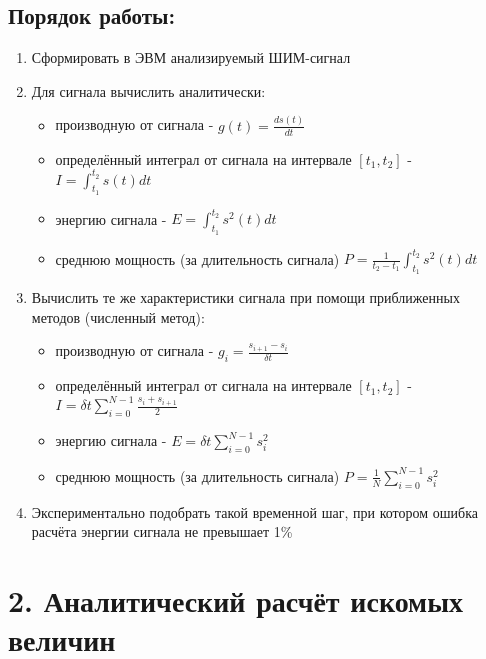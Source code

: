 \documentclass[12pt]{article}
\begin{document}
\subsection*{Порядок работы:}
\begin{enumerate}
	\item Сформировать в ЭВМ анализируемый ШИМ-сигнал 
			
 
	\item Для сигнала вычислить аналитически: 
		\begin{itemize}
			\item производную от сигнала - $g(t) = \frac{ds(t)}{dt}$
			\item определённый интеграл от сигнала на интервале $[t_1, t_2]$ - $I = \int_{t_1}^{t_2} s(t)dt$
			\item энергию сигнала - $ E = \int_{t_1}^{t_2} s^2(t)dt$
			\item среднюю мощность (за длительность сигнала) $P = \frac{1}{t_2-t_1}\int_{t_1}^{t_2} s^2(t)dt$
		\end{itemize}
	\item Вычислить те же характеристики сигнала при помощи приближенных методов (численный метод):
		\begin{itemize}
			\item производную от сигнала - $g_i = \frac{s_{i+1} - s_i}{\delta t}$
			\item определённый интеграл от сигнала на интервале $[t_1, t_2]$ - $I = \delta t \sum_{i=0}^{N-1}\frac{s_i + s_{i+1}}{2}$
			\item энергию сигнала - $ E = \delta t \sum_{i=0}^{N-1} s_i^2$
			\item среднюю мощность (за длительность сигнала) $P = \frac{1}{N}\sum_{i=0}^{N-1} s_i^2$
		\end{itemize}
		
	\item Экспериментально подобрать такой временной шаг, при котором ошибка расчёта энергии сигнала не превышает 1\%

\end{enumerate}

\newpage
 \section*{2. Аналитический расчёт искомых величин}%
 	
 
\end{document}

